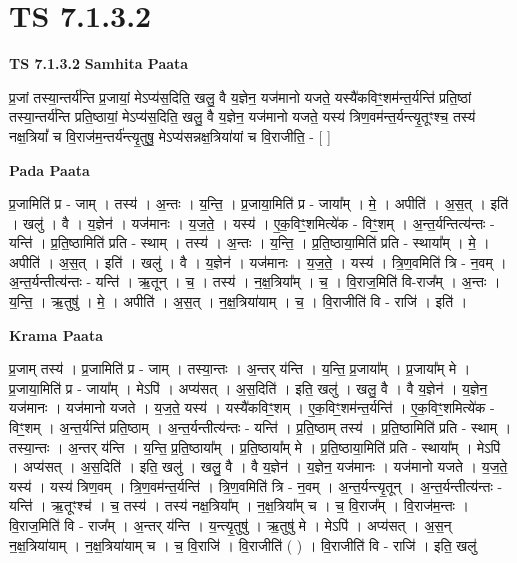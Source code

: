 \documentclass[17pt]{extarticle}
\begin{document}
\section{ TS 7.1.3.2 }

\textbf{TS 7.1.3.2 } \newline
\textbf{Samhita Paata} \newline

प्र॒जां तस्या॒न्तर्य॑न्ति प्र॒जायां॒ मेऽप्य॑स॒दिति॒ खलु॒ वै य॒ज्ञेन॒ यज॑मानो यजते॒ यस्यै॑कविꣳ॒॒शम॑न्त॒र्यन्ति॑ प्रति॒ष्ठां तस्या॒न्तर्य॑न्ति प्रति॒ष्ठायां॒ मेऽप्य॑स॒दिति॒ खलु॒ वै य॒ज्ञेन॒ यज॑मानो यजते॒ यस्य॑ त्रिण॒वम॑न्त॒र्यन्त्यृ॒तूꣳश्च॒ तस्य॑ नक्ष॒त्रियां᳚ च वि॒राज॑म॒न्तर्य॑न्त्यृ॒तुषु॒ मेऽप्य॑सन्नक्ष॒त्रिया॑यां च वि॒राजीति॒ - [  ] \newline

\textbf{Pada Paata} \newline

प्र॒जामिति॑ प्र - जाम् । तस्य॑ । अ॒न्तः । य॒न्ति॒ । प्र॒जाया॒मिति॑ प्र - जाया᳚म् । मे॒ । अपीति॑ । अ॒स॒त् । इति॑ । खलु॑ । वै । य॒ज्ञेन॑ । यज॑मानः । य॒ज॒ते॒ । यस्य॑ । ए॒क॒विꣳ॒॒शमित्ये॑क - विꣳ॒॒शम् । अ॒न्त॒र्यन्तित्य॑न्तः - यन्ति॑ । प्र॒ति॒ष्ठामिति॑ प्रति - स्थाम् । तस्य॑ । अ॒न्तः । य॒न्ति॒ । प्र॒ति॒ष्ठाया॒मिति॑ प्रति - स्थाया᳚म् । मे॒ । अपीति॑ । अ॒स॒त् । इति॑ । खलु॑ । वै । य॒ज्ञेन॑ । यज॑मानः । य॒ज॒ते॒ । यस्य॑ । त्रि॒ण॒वमिति॑ त्रि - न॒वम् । अ॒न्त॒र्यन्तीत्य॑न्तः - यन्ति॑ । ऋ॒तून् । च॒ । तस्य॑ । न॒क्ष॒त्रिया᳚म् । च॒ । वि॒राज॒मिति॑ वि-राज᳚म् । अ॒न्तः । य॒न्ति॒ । ऋ॒तुषु॑ । मे॒ । अपीति॑ । अ॒स॒त् । न॒क्ष॒त्रिया॑याम् । च॒ । वि॒राजीति॑ वि - राजि॑ । इति॑ ।  \newline


\textbf{Krama Paata} \newline

प्र॒जाम् तस्य॑ । प्र॒जामिति॑ प्र - जाम् । तस्या॒न्तः । अ॒न्तर् य॑न्ति । य॒न्ति॒ प्र॒जाया᳚म् । प्र॒जाया᳚म् मे । प्र॒जाया॒मिति॑ प्र - जाया᳚म् । मेऽपि॑ । अप्य॑सत् । अ॒स॒दिति॑ । इति॒ खलु॑ । खलु॒ वै । वै य॒ज्ञेन॑ । य॒ज्ञेन॒ यज॑मानः । यज॑मानो यजते । य॒ज॒ते॒ यस्य॑ । यस्यै॑कविꣳ॒॒शम् । ए॒क॒विꣳ॒॒शम॑न्त॒र्यन्ति॑ । ए॒क॒विꣳ॒॒शमित्ये॑क - विꣳ॒॒शम् । अ॒न्त॒र्यन्ति॑ प्रति॒ष्ठाम् । अ॒न्त॒र्यन्तीत्य॑न्तः - यन्ति॑ । प्र॒ति॒ष्ठाम् तस्य॑ । प्र॒ति॒ष्ठामिति॑ प्रति - स्थाम् । तस्या॒न्तः । अ॒न्तर् य॑न्ति । य॒न्ति॒ प्र॒ति॒ष्ठाया᳚म् । प्र॒ति॒ष्ठाया᳚म् मे । प्र॒ति॒ष्ठाया॒मिति॑ प्रति - स्थाया᳚म् । मेऽपि॑ । अप्य॑सत् । अ॒स॒दिति॑ । इति॒ खलु॑ । खलु॒ वै । वै य॒ज्ञेन॑ । य॒ज्ञेन॒ यज॑मानः । यज॑मानो यजते । य॒ज॒ते॒ यस्य॑ । यस्य॑ त्रिण॒वम् । त्रि॒ण॒वम॑न्त॒र्यन्ति॑ । त्रि॒ण॒वमिति॑ त्रि - न॒वम् । अ॒न्त॒र्यन्त्यृ॒तून् । अ॒न्त॒र्यन्तीत्य॑न्तः - यन्ति॑ । ऋ॒तूꣳश्च॑ । च॒ तस्य॑ । तस्य॑ नक्ष॒त्रिया᳚म् । न॒क्ष॒त्रिया᳚म् च । च॒ वि॒राज᳚म् । वि॒राज॑म॒न्तः । वि॒राज॒मिति॑ वि - राज᳚म् । अ॒न्तर् य॑न्ति । य॒न्त्यृ॒तुषु॑ । ऋ॒तुषु॑ मे । मेऽपि॑ । अप्य॑सत् । अ॒स॒न् न॒क्ष॒त्रिया॑याम् । न॒क्ष॒त्रिया॑याम् च । च॒ वि॒राजि॑ । वि॒राजीति॑ ( ) । वि॒राजीति॑ वि - राजि॑ । इति॒ खलु॑ \newline
\end{document}
